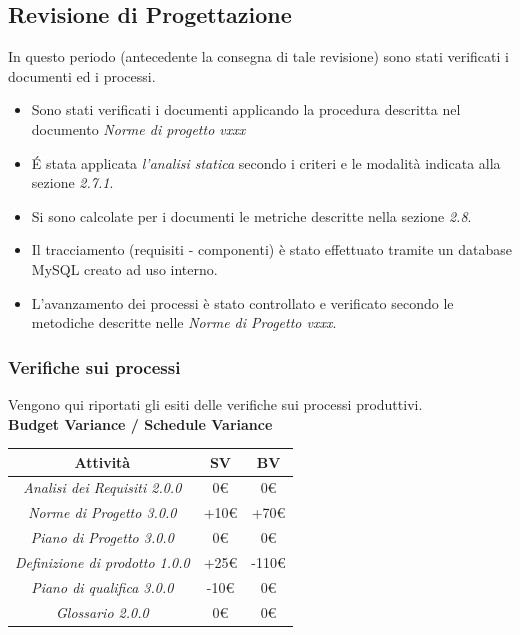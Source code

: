 {  \subsection{Revisione di Progettazione}
  In questo periodo (antecedente la consegna di tale revisione) sono stati verificati i documenti ed i processi.

  \begin{itemize}
  \item Sono stati verificati i documenti applicando la procedura descritta nel documento \emph{Norme di progetto vxxx}
  \item \'E stata applicata \emph{l'analisi statica} secondo i criteri e le modalità indicata alla sezione \emph{2.7.1}.
  \item Si sono calcolate per i documenti le metriche descritte nella sezione \emph{2.8}.
  \item Il tracciamento (requisiti - componenti) è stato effettuato tramite un database MySQL creato ad uso interno.
  \item L'avanzamento dei processi è stato controllato e verificato secondo le metodiche descritte nelle \emph{Norme di Progetto vxxx}.

  \end{itemize}
  \subsubsection{Verifiche sui processi}

  Vengono qui riportati gli esiti delle verifiche sui processi produttivi.\\


  \textbf{Budget Variance / Schedule Variance}

  \begin{center}
    \begin{tabular}{|c|c|c|}

      \hline
      \textbf{Attività} & \textbf{SV} & \textbf{BV} \\
      \hline
      \emph{Analisi dei Requisiti 2.0.0} & 0€ & 0€ \\
      \hline
      \emph{Norme di Progetto 3.0.0} & +10€ & +70€ \\
      \hline
      \emph{Piano di Progetto 3.0.0} & 0€ & 0€ \\
      \hline
      \emph{Definizione di prodotto 1.0.0} & +25€ & -110€ \\
      \hline
      \emph{Piano di qualifica 3.0.0} & -10€ & 0€ \\
      \hline
      \emph{Glossario 2.0.0} & 0€ & 0€ \\
      \hline
    \end{tabular}
  \end{center}

}
